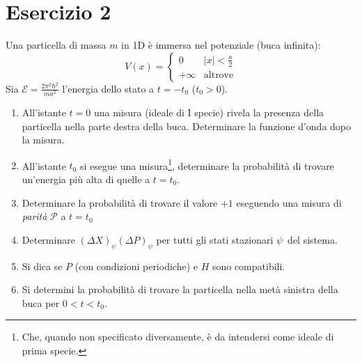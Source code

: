 \documentclass[../../FisicaTeorica.tex]{subfiles}
\begin{document}
\section{Esercizio 2}
Una particella di massa $m$ in 1D è immersa nel potenziale (buca infinita):
\[
V(x)=\begin{cases}
0 & |x|<\frac{a}{2}\\
+\infty & \text{altrove}
\end{cases}
\]
Sia $\mathcal{E}=\frac{2\pi^2\hbar^2}{ma^2}$ l'energia dello stato a $t=-t_0$ ($t_0>0$).
\begin{enumerate}
\item All'istante $t=0$ una misura (ideale di I specie) rivela la presenza della particella nella parte destra della buca. Determinare la funzione d'onda dopo la misura.
\item All'istante $t_0$ si esegue una misura\footnote{Che, quando non specificato diversamente, è da intendersi come ideale di prima specie.}, determinare la probabilità di trovare un'energia più alta di quelle a $t=t_0$.
\item Determinare la probabilità di trovare il valore $+1$ eseguendo una misura di \textit{parità} $\mathcal{P}$ a $t=t_0$
\item Determinare $(\Delta X)_{\psi}(\Delta P)_\psi$ per tutti gli stati stazionari $\psi$\ del sistema.
\item Si dica se $P$ (con condizioni periodiche) e $H$ sono compatibili.
\item Si determini la probabilità di trovare la particella nella metà sinistra della buca per $0<t<t_0$.
\end{enumerate}
\end{document}
